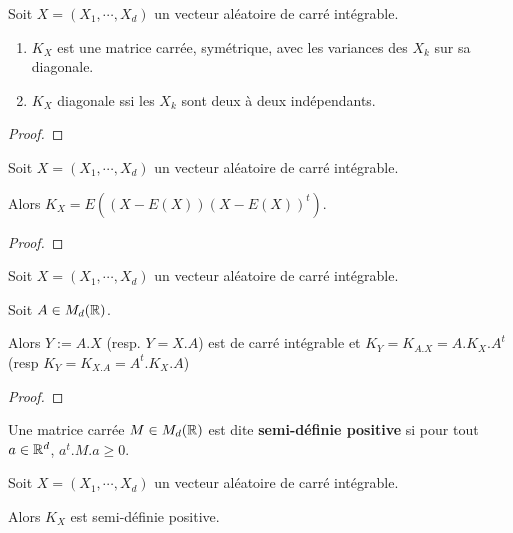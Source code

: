 \begin{proposition}
	Soit $X = (X_{1}, \cdots, X_{d})$ un vecteur aléatoire de carré intégrable.

	\begin{enumerate}
		\item $K_{X}$ est une matrice carrée, symétrique, avec les variances des
			$X_{k}$ sur sa diagonale.
		\item $K_{X}$ diagonale ssi les $X_{k}$ sont deux à deux indépendants.
	\end{enumerate}
\end{proposition}

\ifdefined\outputproof
\begin{proof}

\end{proof}
\fi

\begin{lemma}
	Soit $X = (X_{1}, \cdots, X_{d})$ un vecteur aléatoire de carré intégrable.

	Alors $K_{X} = E( (X - E(X)) (X - E(X))^{t})$.
\end{lemma}

\ifdefined\outputproof
\begin{proof}

\end{proof}
\fi

\begin{proposition}
	Soit $X = (X_{1}, \cdots, X_{d})$ un vecteur aléatoire de carré intégrable.

	Soit $A \in M_{d}(\mathbb{R})$.

	Alors $Y := A . X$ (resp. $Y = X . A$) est de carré intégrable et $K_{Y} =
	K_{A . X} = A . K_{X} . A^{t}$ (resp $K_{Y} = K_{X . A} = A^{t} . K_{X} . A$)
\end{proposition}

\ifdefined\outputproof
\begin{proof}

\end{proof}
\fi

\begin{definition}
	Une matrice carrée $M \in M_{d}(\mathbb{R})$ est dite
	\textbf{semi-définie positive} si pour tout $a \in \mathbb{R}^{d}$, $a^{t} . M .
	a \geq 0$.
\end{definition}

\begin{proposition}
	Soit $X = (X_{1}, \cdots, X_{d})$ un vecteur aléatoire de carré intégrable.

	Alors $K_{X}$ est semi-définie positive.
\end{proposition}

